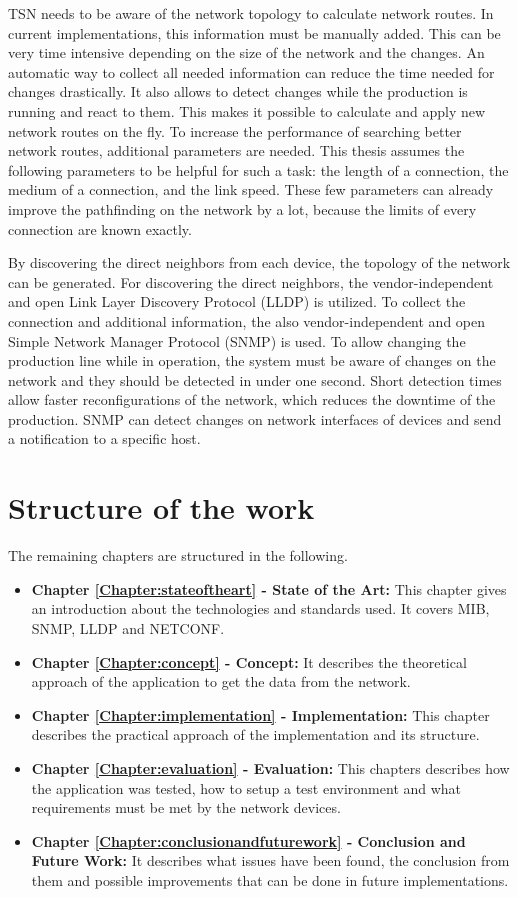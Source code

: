 TSN needs to be aware of the network topology to calculate network routes. In current implementations, this information must be manually added. This can be very time intensive depending on the size of the network and the changes. An automatic way to collect all needed information can reduce the time needed for changes drastically. It also allows to detect changes while the production is running and react to them. This makes it possible to calculate and apply new network routes on the fly. To increase the performance of searching better network routes, additional parameters are needed. This thesis assumes the following parameters to be helpful for such a task: the length of a connection, the medium of a connection, and the link speed. These few parameters can already improve the pathfinding on the network by a lot, because the limits of every connection are known exactly.

By discovering the direct neighbors from each device, the topology of the network can be generated. For discovering the direct neighbors, the vendor-independent and open Link Layer Discovery Protocol (LLDP) is utilized. To collect the connection and additional information, the also vendor-independent and open Simple Network Manager Protocol (SNMP) is used. To allow changing the production line while in operation, the system must be aware of changes on the network and they should be detected in under one second. Short detection times allow faster reconfigurations of the network, which reduces the downtime of the production. SNMP can detect changes on network interfaces of devices and send a notification to a specific host.

\newpage
\section{Structure of the work}
The remaining chapters are structured in the following.
\begin{itemize}
    \item \textbf{Chapter \ref{Chapter:stateoftheart} - State of the Art:} This chapter gives an introduction about the technologies and standards used. It covers MIB, SNMP, LLDP and NETCONF.
    \item \textbf{Chapter \ref{Chapter:concept} - Concept:} It describes the theoretical approach of the application to get the data from the network.
    \item \textbf{Chapter \ref{Chapter:implementation} -  Implementation:} This chapter describes the practical approach of the implementation and its structure.
    \item \textbf{Chapter \ref{Chapter:evaluation} - Evaluation:} This chapters describes how the application was tested, how to setup a test environment and what requirements must be met by the network devices.
    \item \textbf{Chapter \ref{Chapter:conclusionandfuturework} - Conclusion and Future Work:} It describes what issues have been found, the conclusion from them and possible improvements that can be done in future implementations.
\end{itemize}
